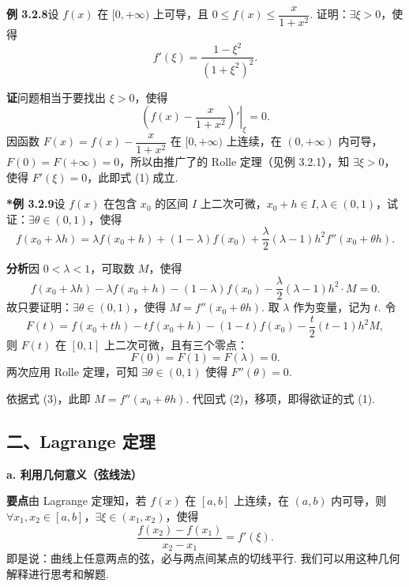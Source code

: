 \documentclass[UTF8, 12pt, fontset=fandol, oneside]{ctexart}
\begin{document}
\noindent\textbf{例 3.2.8}\quad 设 $f(x)$ 在 $[0,+\infty)$ 上可导，且 $0\le f(x)\le\dfrac{x}{1+x^2}$. 证明：$\exists\xi>0$，使得
\[
  f'(\xi)=\frac{1-\xi^2}{(1+\xi^2)^2}.
\]

\noindent\textbf{证}\quad 问题相当于要找出 $\xi>0$，使得
\begin{equation}
  \left.\left(f(x)-\frac{x}{1+x^2}\right)'\right|_{\xi}=0.
\tag{1}
\end{equation}
因函数 $F(x)=f(x)-\dfrac{x}{1+x^2}$ 在 $[0,+\infty)$ 上连续，在 $(0,+\infty)$ 内可导，$F(0)=F(+\infty)=0$，所以由推广了的 Rolle 定理（见例 3.2.1），知 $\exists\xi>0$，使得 $F'(\xi)=0$，此即式 (1) 成立.

\noindent\textbf{*例 3.2.9}\quad 设 $f(x)$ 在包含 $x_0$ 的区间 $I$ 上二次可微，$x_0+h\in I,\lambda\in(0,1)$，试证：$\exists\theta\in(0,1)$，使得
\begin{equation}
  f(x_0+\lambda h)=\lambda f(x_0+h)+(1-\lambda)f(x_0)+\frac{\lambda}{2}(\lambda-1)h^2f''(x_0+\theta h).
\tag{1}
\end{equation}

\noindent\textbf{分析}\quad 因 $0<\lambda<1$，可取数 $M$，使得
\begin{equation}
  f(x_0+\lambda h)-\lambda f(x_0+h)-(1-\lambda)f(x_0)-\frac{\lambda}{2}(\lambda-1)h^2\cdot M=0.
\tag{2}
\end{equation}
故只要证明：$\exists\theta\in(0,1)$，使得 $M=f''(x_0+\theta h)$. 取 $\lambda$ 作为变量，记为 $t$. 令
\begin{equation}
  F(t)=f(x_0+th)-tf(x_0+h)-(1-t)f(x_0)-\frac{t}{2}(t-1)h^2M,
\tag{3}
\end{equation}
则 $F(t)$ 在 $[0,1]$ 上二次可微，且有三个零点：
\[
  F(0)=F(1)=F(\lambda)=0.
\]
两次应用 Rolle 定理，可知 $\exists\theta\in(0,1)$ 使得 $F''(\theta)=0$.

依据式 (3)，此即 $M=f''(x_0+\theta h)$. 代回式 (2)，移项，即得欲证的式 (1).

\subsection*{二、Lagrange 定理}

\noindent\textbf{a. 利用几何意义（弦线法）}

\noindent\textbf{要点}\quad 由 Lagrange 定理知，若 $f(x)$ 在 $[a,b]$ 上连续，在 $(a,b)$ 内可导，则 $\forall x_1,x_2\in[a,b]$，$\exists\xi\in(x_1,x_2)$，使得
\[
  \frac{f(x_2)-f(x_1)}{x_2-x_1}=f'(\xi).
\]
即是说：曲线上任意两点的弦，必与两点间某点的切线平行. 我们可以用这种几何解释进行思考和解题.
\end{document}
